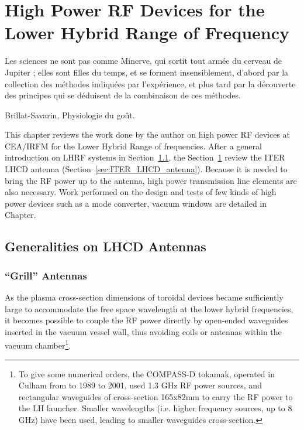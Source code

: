 \setchapterpreamble[u]{\margintoc}
\chapter{High Power RF Devices for the Lower Hybrid Range of Frequency}\label{eq:LHRF_work}

\epigraph{Les sciences ne sont pas comme Minerve, qui sortit tout armée du cerveau de Jupiter ; elles sont filles du temps, et se forment insensiblement, d’abord par la collection des méthodes indiquées par l’expérience, et plus tard par la découverte des principes qui se déduisent de la combinaison de ces méthodes. }{Brillat-Savarin, Physiologie du goût.}


This chapter reviews the work done by the author on high power RF devices at CEA/IRFM for the Lower Hybrid Range of frequencies. After a general introduction on LHRF systems in Section~\ref{sec:LHCD_antennas_general}, the Section~\ref{eq:LHRF_work} review the ITER LHCD antenna (Section~\ref{sec:ITER_LHCD_antenna}). Because it is needed to bring the RF power up to the antenna, high power transmission line elements are also necessary. Work performed on the design and tests of few kinds of high power devices such as a mode converter, vacuum windows are detailed in Chapter. 


\section{Generalities on LHCD Antennas}\label{sec:LHCD_antennas_general}

\subsection{“Grill” Antennas}
As the plasma cross-section dimensions of toroidal devices became sufficiently large to accommodate the free space wavelength at the lower hybrid frequencies, it becomes possible to couple the RF power directly by open-ended waveguides inserted in the vacuum vessel wall, thus avoiding coils or antennas within the vacuum chamber\footnote{To give some numerical orders, the COMPASS-D tokamak, operated in Culham from to 1989 to 2001, used 1.3 GHz RF power sources, and rectangular waveguides of cross-section 165x82mm to carry the RF power to the LH launcher. Smaller wavelengths (i.e. higher frequency sources, up to 8 GHz) have been used, leading to smaller waveguides cross-section.}.

